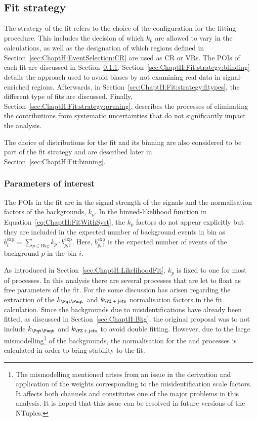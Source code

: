 \subsection{Fit strategy}
\label{sec:ChaptH:Fit:strategy}
The strategy of the fit refers to the choice of the configuration for the fitting procedure.
This includes the decision of  which $k_{p}$ are allowed to vary in the calculations, as well
as the designation of which regions defined in Section~\ref{sec:ChaptH:EventSelection:CR} 
are used as CR or VRs. 
The POIs of each fit are discussed in Section~\ref{sec:ChaptH:Fit:strategy:POIs}.
Section~\ref{sec:ChaptH:Fit:strategy:blinding} details the approach used to avoid biases 
by not examining real data in signal-enriched regions.
Afterwards, in Section~\ref{sec:ChaptH:Fit:strategy:fitypes}, the different type of fits
are discussed.
Finally, Section~\ref{sec:ChaptH:Fit:strategy:pruning}, describes the processes
of eliminating the contributions from systematic uncertainties that do not significantly impact the analysis.

The choice of distributions for the 
fit and its binning are also considered to be part of the fit strategy and are described
later in Section~\ref{sec:ChaptH:Fit:binning}.


\subsubsection{Parameters of interest}
\label{sec:ChaptH:Fit:strategy:POIs}
The POIs in the fit are in the signal strength of the \tHq signals and the normalisation factors of the backgrounds, $k_p$.
In the binned-likelihood function in Equation~\ref{eq:ChaptH:FitWithSyst}, the $k_p$ factors
do not appear explicitly but they are included in the expected number of background events in bin 
as $b_{i}^{\text{exp}} =  \sum_{p \in \text{Bkg}} k_{p} \cdot b_{p, i}^{\text{exp}}$. 
Here, $b_{p, i}^{\text{exp}}$ is the expected number of events of the background $p$ in the bin $i$.

As introduced in Section~\ref{sec:ChaptH:LikelihoodFit}, $k_p$ is fixed to one for most of processes.
In this analysis there are several processes that are let to float as free parameters of the fit.
For the \dilepOStau some discussion has arisen regarding the extraction of the 
$k_{\ttbar}$ and $k_{\Zjets}$ normalisation factors in the fit calculation.
Since the backgrounds due to misidentifications have already been fitted, as discussed 
in Section~\ref{sec:ChaptH:Bkg}, the original proposal was to not include $k_{\ttbar}$ and $k_{\Zjets}$ to 
avoid double fitting. However, due to the large mismodelling\footnote{The mismodelling mentioned arises from an 
issue in the derivation and application of the weights corresponding to the misidentification scale factors. It affects both \dileptau channels and 
constitutes one of the major problems in this analysis. It is hoped that this issue can be resolved in future versions 
of the NTuples.} of the backgrounds, the normalisation for the \ttbar and \Zjets  processes is calculated in 
order to bring stability to the fit.  

